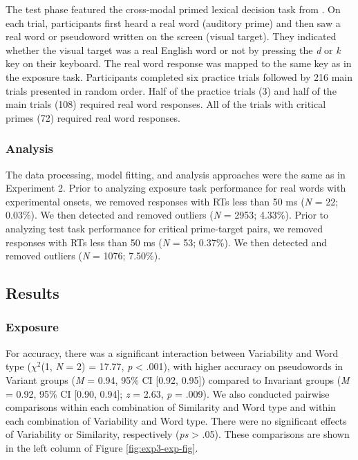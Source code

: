 \documentclass[preprint, 3p, authoryear]{elsarticle} %
\begin{document}
The test phase featured the cross-modal primed lexical decision task from \citet{xie2017similarity}.
On each trial, participants first heard a real word (auditory prime) and then saw a real word or pseudoword written on the screen (visual target).
They indicated whether the visual target was a real English word or not by pressing the \emph{d} or \emph{k} key on their keyboard.
The real word response was mapped to the same key as in the exposure task.
Participants completed six practice trials followed by 216 main trials presented in random order.
Half of the practice trials (3) and half of the main trials (108) required real word responses.
All of the trials with critical primes (72) required real word responses.

\hypertarget{analysis}{%
\subsubsection{Analysis}\label{analysis}}

The data processing, model fitting, and analysis approaches were the same as in Experiment 2.
Prior to analyzing exposure task performance for real words with experimental onsets, we removed responses with RTs less than 50 ms (\emph{N} = 22; 0.03\%).
We then detected and removed outliers (\emph{N} = 2953; 4.33\%).
Prior to analyzing test task performance for critical prime-target pairs, we removed responses with RTs less than 50 ms (\emph{N} = 53; 0.37\%).
We then detected and removed outliers (\emph{N} = 1076; 7.50\%).

\hypertarget{results-2}{%
\subsection{Results}\label{results-2}}

\hypertarget{exposure-2}{%
\subsubsection{Exposure}\label{exposure-2}}

For accuracy, there was a significant interaction between Variability and Word type (\(\chi^2\)(1, \emph{N} = 2) = 17.77, \emph{p} \textless{} .001), with higher accuracy on pseudowords in Variant groups (\emph{M} = 0.94, 95\% CI {[}0.92, 0.95{]}) compared to Invariant groups (\emph{M} = 0.92, 95\% CI {[}0.90, 0.94{]}; \emph{z} = 2.63, \emph{p} = .009).
We also conducted pairwise comparisons within each combination of Similarity and Word type and within each combination of Variability and Word type.
There were no significant effects of Variability or Similarity, respectively (\emph{ps} \textgreater{} .05).
These comparisons are shown in the left column of Figure \ref{fig:exp3-exp-fig}.
\end{document}
